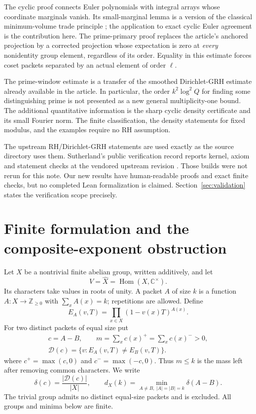 \documentclass[11pt]{article}
\theoremstyle{definition}
\theoremstyle{remark}
\newcommand{\Z}{\mathbb Z}
\newcommand{\C}{\mathbb C}
\begin{document}
The cyclic proof connects Euler polynomials with integral arrays whose coordinate marginals vanish. Its small-marginal lemma is a version of the classical minimum-volume trade principle \cite{trades}; the application to exact cyclic Euler agreement is the contribution here. The prime-primary proof replaces the article's anchored projection by a corrected projection whose expectation is zero at \emph{every} nonidentity group element, regardless of its order. Equality in this estimate forces coset packets separated by an actual element of order $\ell$.

The prime-window estimate is a transfer of the smoothed Dirichlet-GRH estimate already available in the article. In particular, the order $k^2\log^2 Q$ for finding some distinguishing prime is not presented as a new general multiplicity-one bound. The additional quantitative information is the sharp cyclic density certificate and its small Fourier norm. The finite classification, the density statements for fixed modulus, and the examples require no RH assumption.

The upstream RH/Dirichlet-GRH statements are used exactly as the source directory uses them. Sutherland's public verification record reports kernel, axiom and statement checks at the vendored upstream revision \cite{sutherland}. Those builds were not rerun for this note. Our new results have human-readable proofs and exact finite checks, but no completed Lean formalization is claimed. Section~\ref{sec:validation} states the verification scope precisely.

\section{Finite formulation and the composite-exponent obstruction}
Let $X$ be a nontrivial finite abelian group, written additively, and let
\[
 V=\widehat X=\operatorname{Hom}(X,\C^\times).
\]
Its characters take values in roots of unity. A packet $A$ of size $k$ is a function $A:X\to\Z_{\ge0}$ with $\sum_x A(x)=k$; repetitions are allowed. Define
\[
 E_A(v,T)=\prod_{x\in X}(1-v(x)T)^{A(x)}.
\]
For two distinct packets of equal size put
\[
 \begin{gathered}c=A-B,\qquad m=\sum_x c(x)^+=\sum_x c(x)^->0,\\
\mathcal D(c)=\{v:E_A(v,T)\ne E_B(v,T)\}.\end{gathered}
\]
where $c^+=\max(c,0)$ and $c^-=\max(-c,0)$. Thus $m\le k$ is the mass left after removing common characters. We write
\[
 \delta(c)=\frac{|\mathcal D(c)|}{|X|},\qquad
 d_X(k)=\min_{A\ne B,\ |A|=|B|=k}\delta(A-B).
\]
The trivial group admits no distinct equal-size packets and is excluded. All groups and minima below are finite.
\end{document}
